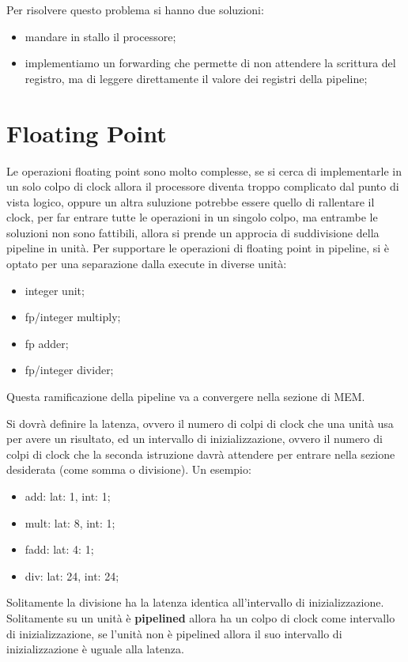 \documentclass[12pt]{article}
\begin{document}
Per risolvere questo problema si hanno due soluzioni:
\begin{itemize}
    \item mandare in stallo il processore;
    \item implementiamo un forwarding che permette di non attendere la scrittura del registro, ma di leggere direttamente il valore dei registri della pipeline;
\end{itemize}


\section{Floating Point}
Le operazioni floating point sono molto complesse, se si cerca di implementarle in un solo colpo di clock allora il processore diventa troppo complicato dal punto di vista logico, oppure un altra suluzione potrebbe essere quello di rallentare il clock, per far entrare tutte le operazioni in un singolo colpo, ma entrambe le soluzioni non sono fattibili, allora si prende un approcia di suddivisione della pipeline in unit\`a. Per supportare le operazioni di floating point in pipeline, si \`e optato per una separazione dalla execute in diverse unit\`a:
\begin{itemize}
    \item integer unit;
    \item fp/integer multiply;
    \item fp adder;
    \item fp/integer divider;
\end{itemize}
Questa ramificazione della pipeline va a convergere nella sezione di MEM.

Si dovr\`a definire la latenza, ovvero il numero di colpi di clock che una unit\`a usa per avere un risultato, ed un intervallo di inizializzazione, ovvero il numero di colpi di clock che la seconda istruzione davr\`a attendere per entrare nella sezione desiderata (come somma o divisione). Un esempio:
\begin{itemize}
    \item add: lat: 1, int: 1;
    \item mult: lat: 8, int: 1;
    \item fadd: lat: 4: 1;
    \item div: lat: 24, int: 24;
\end{itemize}

Solitamente la divisione ha la latenza identica all'intervallo di inizializzazione. Solitamente su un unit\`a \`e \textbf{pipelined} allora ha un colpo di clock come intervallo di inizializzazione, se l'unit\`a non \`e pipelined allora il suo intervallo di inizializzazione \`e uguale alla latenza.
\end{document}
